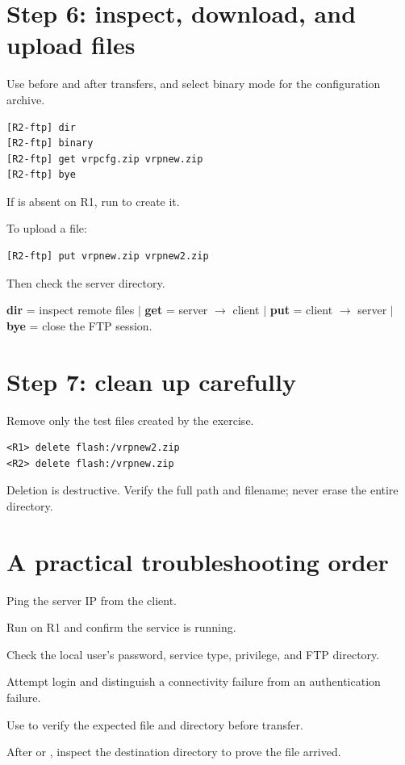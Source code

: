 \section{Step 6: inspect, download, and upload files}
Use  before and after transfers, and select binary mode for the configuration archive.
\begin{lstlisting}[style=dcnterminal]
[R2-ftp] dir
[R2-ftp] binary
[R2-ftp] get vrpcfg.zip vrpnew.zip
[R2-ftp] bye
\end{lstlisting}
If  is absent on R1, run  to create it.

To upload a file:
\begin{lstlisting}[style=dcnterminal]
[R2-ftp] put vrpnew.zip vrpnew2.zip
\end{lstlisting}
Then check the server directory.

\begin{conceptmap}
\textbf{dir} = inspect remote files \quad $\vert$ \quad
\textbf{get} = server $\rightarrow$ client \quad $\vert$ \quad
\textbf{put} = client $\rightarrow$ server \quad $\vert$ \quad
\textbf{bye} = close the FTP session.
\end{conceptmap}

\section{Step 7: clean up carefully}
Remove only the test files created by the exercise.
\begin{lstlisting}[style=dcnterminal]
<R1> delete flash:/vrpnew2.zip
<R2> delete flash:/vrpnew.zip
\end{lstlisting}

\begin{pitfall}
Deletion is destructive. Verify the full path and filename; never erase the entire  directory.
\end{pitfall}

\section{A practical troubleshooting order}
\begin{netsteps}
\item Ping the server IP from the client.
\item Run  on R1 and confirm the service is running.
\item Check the local user's password, service type, privilege, and FTP directory.
\item Attempt login and distinguish a connectivity failure from an authentication failure.
\item Use  to verify the expected file and directory before transfer.
\item After  or , inspect the destination directory to prove the file arrived.
\end{netsteps}


